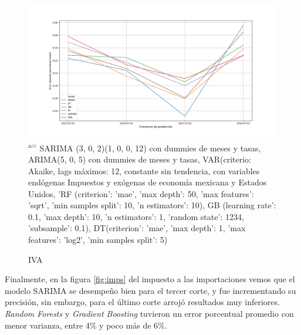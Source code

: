 \documentclass[a4paper, 11pt]{article}
\begin{document}
\begin{figure}[hbt!]
    \centering
     \caption{IVA}
     \label{fig:iva}
     \includegraphics[scale = 0.4]{figures/iva_neto_(mdp)_r_prec_cierre}
      \small\textsuperscript{a=} SARIMA (3, 0, 2)(1, 0, 0, 12) con dummies de meses y tasas, ARIMA(5, 0, 5) con dummies de meses y tasas, VAR(criterio: Akaike, lags máximos: 12, constante sin tendencia, con variables endógenas Impuestos y exógenas de economía mexicana y Estados Unidos,  'RF (criterion': 'mae', 'max depth': 50, 'max features': 'sqrt', 'min samples split': 10, 'n estimators': 10), GB (learning rate': 0.1, 'max depth': 10, 'n estimators': 1, 'random state': 1234, 'subsample': 0.1),  DT(criterion': 'mae', 'max depth': 1, 'max features': 'log2', 'min samples split': 5)
\end{figure}

Finalmente, en la figura \ref{fig:imps} del impuesto a las importaciones vemos que el modelo SARIMA se desempeño bien para el tercer corte, y fue incrementando su precisión, sin embargo, para el último corte arrojó resultados muy inferiores. \textit{Random Forests} y \textit{Gradient Boosting} tuvieron un error porcentual promedio con menor varianza, entre 4\% y poco más de 6\%. 
\end{document}

